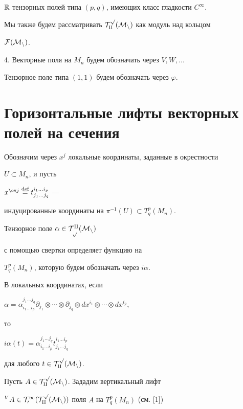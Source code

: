$\Bbb R$ тензорных полей типа $(p,q)$, имеющих класс гладкости $C^\infty$.


Мы также будем рассматривать $\cal T^p_q(M_n)$ как модуль над кольцом


$\cal F(M_n)$. 





4. Векторные поля на $M_n$ будем обозначать через $V, W, \dotsc$ 


Тензорное поле типа $(1,1)$ будем обозначать через $\varphi$.





\section{Горизонтальные лифты векторных полей на сечения}





Обозначим через $x^j$ локальные координаты, заданные в окрестности 


$U \subset M_n$, и пусть 


$x^{\ov j} \overset{\text{def}}{=} t^{i_1 \dotsc i_p}_{j_1 \dotsc j_q}$ ---


индуцированные координаты на $\pi^{-1}(U) \subset T^p_q(M_n)$.





Тензорное поле $\alpha \in \cal T^q_p(M_n)$


с помощью свертки определяет функцию на


$T^p_q(M_n)$, которую будем обозначать через $i\alpha$. 


В локальных координатах, если 


$\alpha = \alpha_{i_1 \dotsc i_p}^{j_1 \dotsc j_q} 


\partial_{j_1} \otimes \dotsb \otimes \partial_{j_q}


\otimes dx^{i_1} \otimes \dotsb\otimes dx^{i_p}$,


то 


$i\alpha (t) = \alpha_{i_1 \dotsc i_p}^{j_1 \dotsc j_q}


t^{i_1 \dotsc i_p}_{j_1 \dotsc j_q}$


для любого $t \in \cal T^p_q(M_n)$.





Пусть $A \in \cal T^p_q(M_n)$. Зададим вертикальный лифт 


${}^V A \in \cal T^1_0(T^p_q(M_n))$ поля $A$ на $T^p_q(M_n)$ (см. [1])


